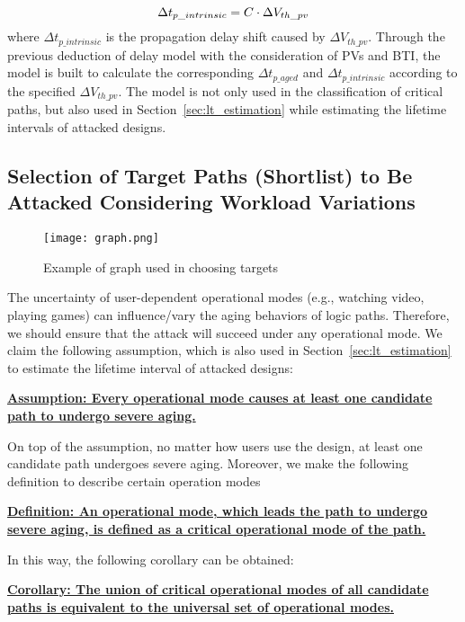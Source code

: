 \begin{equation}
	\centering
	\fontsize{9}{9} \selectfont
	\Delta t_{p\_intrinsic} = C \cdot \Delta V_{th\_pv}
	\label{eq:vtodelay2}
\end{equation}	
where $\Delta t_{p\_intrinsic}$ is the propagation delay shift caused by $\Delta V_{th\_pv}$. Through the previous deduction of delay model with the consideration of PVs and BTI, the model is built to calculate the corresponding $\Delta t_{p\_aged}$ and $\Delta t_{p\_intrinsic}$ according to the specified $\Delta V_{th\_pv}$. The model is not only used in the classification of critical paths, but also used in Section~\ref{sec:lt_estimation} while estimating the lifetime intervals of attacked designs. 
\subsection{Selection of Target Paths (Shortlist) to Be Attacked Considering Workload Variations}
\label{sec:frame:workload}
\begin{figure}
	\centering
	\texttt{[image: graph.png]}
	\caption{Example of graph used in choosing targets}
	\label{fig:graph}
\end{figure}

The uncertainty of user-dependent operational modes (e.g., watching video, playing games) can influence/vary the aging behaviors of logic paths. Therefore, we should ensure that the attack will succeed under any operational mode. We claim the following assumption, which is also used in Section~\ref{sec:lt_estimation} to estimate the lifetime interval of attacked designs:

\noindent \textbf{\uline{Assumption: Every operational mode causes at least one candidate path to undergo severe aging.}}

On top of the assumption, no matter how users use the design, at least one candidate path undergoes severe aging. Moreover, we make the following definition to describe certain operation modes

\noindent \textbf{\uline{Definition: An operational mode, which leads the path to undergo severe aging, is defined as a critical operational mode of the path.}}

In this way, the following corollary can be obtained:

\noindent \textbf{\uline{Corollary: The union of critical operational modes of all candidate paths is equivalent to the universal set of operational modes.}}

